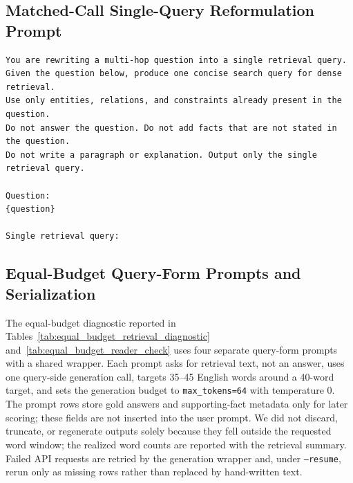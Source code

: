 \documentclass[pdflatex,sn-basic,Numbered]{sn-jnl}
\begin{document}
\subsection{Matched-Call Single-Query Reformulation Prompt}
\begingroup\footnotesize
\begin{verbatim}
You are rewriting a multi-hop question into a single retrieval query.
Given the question below, produce one concise search query for dense retrieval.
Use only entities, relations, and constraints already present in the question.
Do not answer the question. Do not add facts that are not stated in the question.
Do not write a paragraph or explanation. Output only the single retrieval query.

Question:
{question}

Single retrieval query:
\end{verbatim}
\endgroup

\subsection{Equal-Budget Query-Form Prompts and Serialization}
\label{sec:supp_equal_budget_prompts}

The equal-budget diagnostic reported in Tables~\ref{tab:equal_budget_retrieval_diagnostic} and~\ref{tab:equal_budget_reader_check} uses four separate query-form prompts with a shared wrapper. Each prompt asks for retrieval text, not an answer, uses one query-side generation call, targets 35--45 English words around a 40-word target, and sets the generation budget to \texttt{max\_tokens=64} with temperature 0. The prompt rows store gold answers and supporting-fact metadata only for later scoring; these fields are not inserted into the user prompt. We did not discard, truncate, or regenerate outputs solely because they fell outside the requested word window; the realized word counts are reported with the retrieval summary. Failed API requests are retried by the generation wrapper and, under \texttt{--resume}, rerun only as missing rows rather than replaced by hand-written text.
\end{document}
